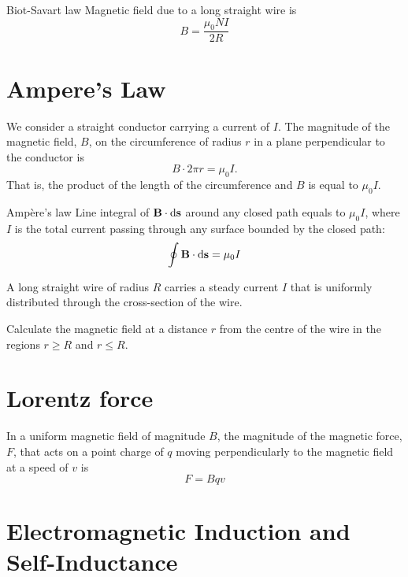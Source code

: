 \begin{thrm}{Biot-Savart law}{}
Magnetic field due to a long straight wire is
\begin{equation}
{B=\frac{\mu_{0} N I}{2 R}
}\end{equation}
\end{thrm}

\section{Ampere's Law}
We consider a straight conductor carrying a current of $I$. The magnitude of the magnetic field, $B$, on the circumference of radius $r$ in a plane perpendicular to the conductor is
\[ B \cdot 2\pi r = \mu_0I. \]
That is, the product of the length of the circumference and $B$ is equal to $\mu_0I$.




\begin{thrm}{Amp\`{e}re's law}{}
Line integral of $\vb{B}\cdot\dd{\vb{s}}$ around any closed path equals to $\mu_0I$, where $I$ is the total current passing through any surface bounded by the closed path:
\begin{equation}
{\oint \vb{B}\cdot\dd{\vb{s}} = \mu_0I}
\end{equation}
\end{thrm}

\begin{exmp}
A long straight wire of radius $R$ carries a steady current $I$ that is uniformly distributed through the cross-section of the wire.

Calculate the magnetic field at a distance $r$ from the centre of the wire in the regions $r\ge R$ and $r\le R$.
\end{exmp}

\section{Lorentz force}
In a uniform magnetic field of magnitude $B$, the magnitude of the magnetic force, $F$, that acts on a point charge of $q$ moving perpendicularly to the magnetic field at a speed of $v$ is
\[ F=Bqv \]



\section{Electromagnetic Induction and Self-Inductance}

\section{}


